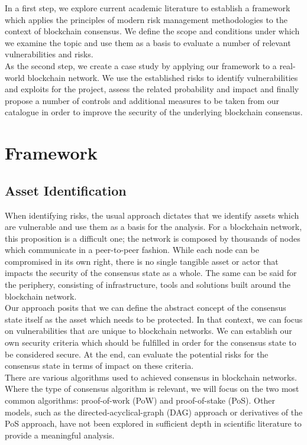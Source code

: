 \documentclass[12pt,a4paper]{article}
\begin{document}
In a first step, we explore current academic literature to establish a framework which applies the principles of modern risk management methodologies to the context of blockchain consensus. We define the scope and conditions under which we examine the topic and use them as a basis to evaluate a number of relevant vulnerabilities and risks.\\

As the second step, we create a case study by applying our framework to a real-world blockchain network. We use the established risks to identify vulnerabilities and exploits for the project, assess the related probability and impact and finally propose a number of controls and additional measures to be taken from our catalogue in order to improve the security of the underlying blockchain consensus.\\

\section{Framework}

\subsection{Asset Identification}

When identifying risks, the usual approach dictates that we identify assets which are vulnerable and use them as a basis for the analysis. For a blockchain network, this proposition is a difficult one; the network is composed by thousands of nodes which communicate in a peer-to-peer fashion. While each node can be compromised in its own right, there is no single tangible asset or actor that impacts the security of the consensus state as a whole. The same can be said for the periphery, consisting of infrastructure, tools and solutions built around the blockchain network.\\

Our approach posits that we can define the abstract concept of the consensus state itself as the asset which needs to be protected. In that context, we can focus on vulnerabilities that are unique to blockchain networks. We can establish our own security criteria which should be fulfilled in order for the consensus state to be considered secure. At the end, can evaluate the potential risks for the consensus state in terms of impact on these criteria.\\

There are various algorithms used to achieved consensus in blockchain networks. Where the type of consensus algorithm is relevant, we will focus on the two most common algorithms: proof-of-work (PoW) and proof-of-stake (PoS). Other models, such as the directed-acyclical-graph (DAG) approach or derivatives of the PoS approach, have not been explored in sufficient depth in scientific literature to provide a meaningful analysis.\\
\end{document}
